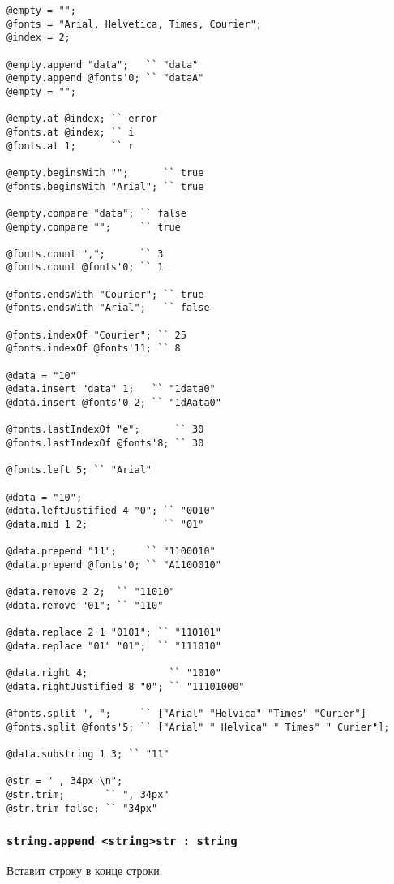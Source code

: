 \documentclass[a4paper, 14pt]{extarticle}
\begin{document}
\begin{lstlisting}[caption=Методы класса string, label=stringmethods]
@empty = "";
@fonts = "Arial, Helvetica, Times, Courier";
@index = 2;

@empty.append "data";   `` "data"
@empty.append @fonts'0; `` "dataA"
@empty = "";

@empty.at @index; `` error
@fonts.at @index; `` i
@fonts.at 1;	  `` r

@empty.beginsWith "";      `` true
@fonts.beginsWith "Arial"; `` true

@empty.compare "data"; `` false
@empty.compare "";     `` true

@fonts.count ",";      `` 3
@fonts.count @fonts'0; `` 1

@fonts.endsWith "Courier"; `` true
@fonts.endsWith "Arial";   `` false

@fonts.indexOf "Courier"; `` 25
@fonts.indexOf @fonts'11; `` 8

@data = "10"
@data.insert "data" 1;   `` "1data0"
@data.insert @fonts'0 2; `` "1dAata0"

@fonts.lastIndexOf "e";      `` 30
@fonts.lastIndexOf @fonts'8; `` 30

@fonts.left 5; `` "Arial"

@data = "10";
@data.leftJustified 4 "0"; `` "0010"
@data.mid 1 2;             `` "01"

@data.prepend "11";     `` "1100010"
@data.prepend @fonts'0; `` "A1100010"

@data.remove 2 2;  `` "11010"
@data.remove "01"; `` "110"

@data.replace 2 1 "0101"; `` "110101"
@data.replace "01" "01";  `` "111010"

@data.right 4; 				`` "1010"
@data.rightJustified 8 "0"; `` "11101000"

@fonts.split ", ";     `` ["Arial" "Helvica" "Times" "Curier"]
@fonts.split @fonts'5; `` ["Arial" " Helvica" " Times" " Curier"];

@data.substring 1 3; `` "11"

@str = " , 34px \n";
@str.trim;       `` ", 34px"
@str.trim false; `` "34px"
\end{lstlisting}

\subsubsection{\lstinline|string.append <string>str : string|}

Вставит строку  в конце строки.
\end{document}
